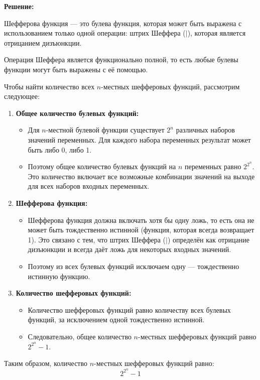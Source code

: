 \documentclass[12pt,a4paper]{article}
\begin{document}
\textbf{Решение:}

Шефферова функция — это булева функция, которая может быть выражена с использованием только одной операции: штрих Шеффера (\(\mid\)), которая является отрицанием дизъюнкции.

Операция Шеффера является функционально полной, то есть любые булевы функции могут быть выражены с её помощью.

Чтобы найти количество всех \(n\)-местных шефферовых функций, рассмотрим следующее:

\begin{enumerate}[label=\arabic*., leftmargin=*]
    \item \textbf{Общее количество булевых функций:} 
    \begin{itemize}
        \item Для \(n\)-местной булевой функции существует \(2^n\) различных наборов значений переменных. Для каждого набора переменных результат может быть либо 0, либо 1.
        \item Поэтому общее количество булевых функций на \(n\) переменных равно \(2^{2^n}\). Это количество включает все возможные комбинации значений на выходе для всех наборов входных переменных.
    \end{itemize}
    
    \item \textbf{Шефферова функция:}
    \begin{itemize}
        \item Шефферова функция должна включать хотя бы одну ложь, то есть она не может быть тождественно истинной (функция, которая всегда возвращает 1). Это связано с тем, что штрих Шеффера (\(\mid\)) определён как отрицание дизъюнкции и всегда даёт ложь для некоторых входных значений.
        \item Поэтому из всех булевых функций исключаем одну — тождественно истинную функцию.
    \end{itemize}
    
    \item \textbf{Количество шефферовых функций:} 
    \begin{itemize}
        \item Количество шефферовых функций равно количеству всех булевых функций, за исключением одной тождественно истинной.
        \item Следовательно, общее количество \(n\)-местных шефферовых функций равно \(2^{2^n} - 1\).
    \end{itemize}
\end{enumerate}

Таким образом, количество \(n\)-местных шефферовых функций равно:
\[
\boxed{2^{2^n} - 1}
\]
\end{document}

